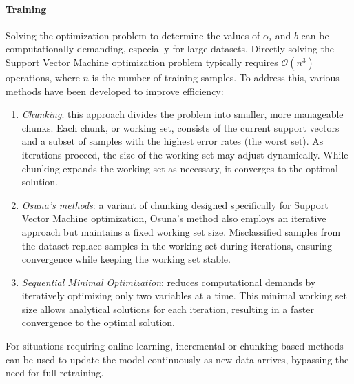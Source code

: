 \paragraph*{Training}
Solving the optimization problem to determine the values of $\alpha_i$ and $b$ can be computationally demanding, especially for large datasets.
Directly solving the Support Vector Machine optimization problem typically requires $\mathcal{O}(n^3)$ operations, where $n$ is the number of training samples. 
To address this, various methods have been developed to improve efficiency:
\begin{enumerate}
    \item \textit{Chunking}: this approach divides the problem into smaller, more manageable chunks. 
        Each chunk, or working set, consists of the current support vectors and a subset of samples with the highest error rates (the worst set). 
        As iterations proceed, the size of the working set may adjust dynamically. 
        While chunking expands the working set as necessary, it converges to the optimal solution.
    \item \textit{Osuna's methods}: a variant of chunking designed specifically for Support Vector Machine optimization, Osuna's method also employs an iterative approach but maintains a fixed working set size. 
        Misclassified samples from the dataset replace samples in the working set during iterations, ensuring convergence while keeping the working set stable.
    \item \textit{Sequential Minimal Optimization}: reduces computational demands by iteratively optimizing only two variables at a time. 
        This minimal working set size allows analytical solutions for each iteration, resulting in a faster convergence to the optimal solution.
\end{enumerate}
For situations requiring online learning, incremental or chunking-based methods can be used to update the model continuously as new data arrives, bypassing the need for full retraining.

